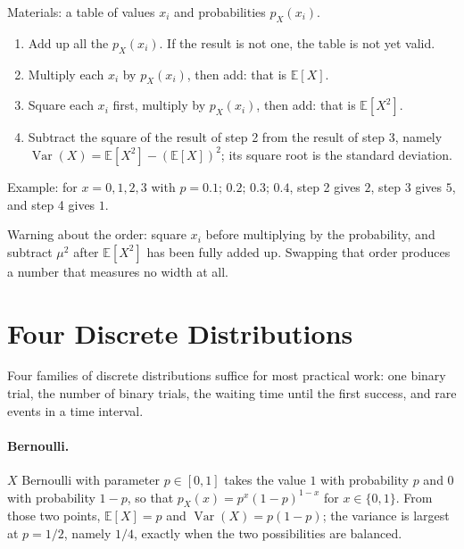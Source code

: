 \begin{resep}
Materials: a table of values $x_i$ and probabilities $p_X(x_i)$.
\begin{enumerate}
  \item Add up all the $p_X(x_i)$. If the result is not one, the table is not yet valid.
  \item Multiply each $x_i$ by $p_X(x_i)$, then add: that is $\mathbb{E}[X]$.
  \item Square each $x_i$ first, multiply by $p_X(x_i)$, then add:
        that is $\mathbb{E}[X^2]$.
  \item Subtract the square of the result of step 2 from the result of step 3, namely
        $\operatorname{Var}(X)=\mathbb{E}[X^2]-(\mathbb{E}[X])^2$; its square root
        is the standard deviation.
\end{enumerate}
Example: for $x=0,1,2,3$ with $p=0.1;\,0.2;\,0.3;\,0.4$, step 2 gives
$2$, step 3 gives $5$, and step 4 gives $1$.

Warning about the order: square $x_i$ before multiplying by the probability, and subtract
$\mu^2$ after $\mathbb{E}[X^2]$ has been fully added up. Swapping that order produces
a number that measures no width at all.
\end{resep}



\section{Four Discrete Distributions}

Four families of discrete distributions suffice for most practical work: one
binary trial, the number of binary trials, the waiting time until the first success, and
rare events in a time interval.

\paragraph{Bernoulli.} $X$ Bernoulli with parameter $p\in[0,1]$ takes the value $1$ with
probability $p$ and $0$ with probability $1-p$, so that $p_X(x)=p^x(1-p)^{1-x}$ for
$x\in\{0,1\}$. From those two points, $\mathbb{E}[X]=p$ and
$\operatorname{Var}(X)=p(1-p)$; the variance is largest at $p=1/2$, namely $1/4$, exactly
when the two possibilities are balanced.

